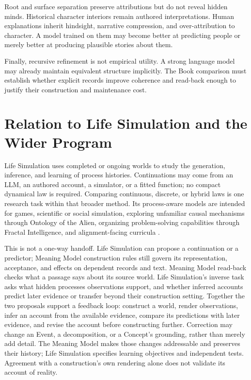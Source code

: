 \documentclass[11pt,a4paper]{article}
\begin{document}
Root and surface separation preserve attributions but do not reveal hidden minds.
Historical character interiors remain authored interpretations. Human
explanations inherit hindsight, narrative compression, and over-attribution to
character. A model trained on them may become better at predicting people or
merely better at producing plausible stories about them.

Finally, recursive refinement is not empirical utility. A strong language model
may already maintain equivalent structure implicitly. The Book comparison must
establish whether explicit records improve coherence and read-back enough to
justify their construction and maintenance cost.

\section{Relation to Life Simulation and the Wider Program}
\label{sec:companion}

Life Simulation uses completed or ongoing worlds to study the generation,
inference, and learning of process histories. Continuations may come from an
LLM, an authored account, a simulator, or a fitted function; no compact
dynamical law is required. Comparing continuous, discrete, or hybrid laws is
one research task within that broader method. Its process-aware models are
intended for games, scientific or social simulation, exploring unfamiliar
causal mechanisms through Ontology of the Alien, organizing problem-solving
capabilities through Fractal Intelligence, and alignment-facing curricula
\cite{westerbergLifeSimulation2026}.

This is not a one-way handoff. Life Simulation can propose a continuation or a
predictor; Meaning Model construction rules still govern its representation,
acceptance, and effects on dependent records and text. Meaning Model read-back
checks what a passage says about its source world. Life Simulation's inverse
task asks what hidden processes observations support, and whether inferred
accounts predict later evidence or transfer beyond their construction setting.
Together the two proposals support a feedback loop: construct a world, render
observations, infer an account from the available evidence, compare its
predictions with later evidence, and revise the account before constructing
further. Correction may change an Event, a decomposition, or a Concept's
grounding, rather than merely add detail. The Meaning Model makes those changes
addressable and preserves their history; Life Simulation specifies learning
objectives and independent tests. Agreement with a construction's own rendering
alone does not validate its account of reality.
\end{document}
